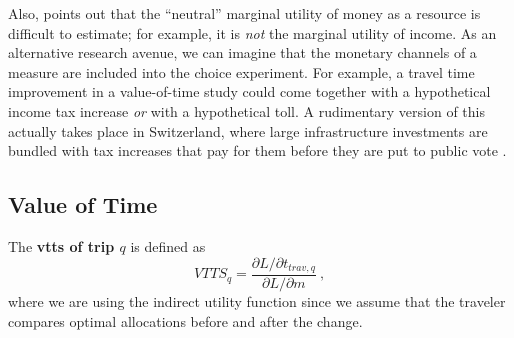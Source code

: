 Also, \cite{Small2012ValuationOfTimeRevisited} points out that the ``neutral'' marginal utility of money as a resource is difficult to estimate; for example, it is \emph{not} the marginal utility of income.  As an alternative research avenue, we can imagine that the monetary channels of a measure are included into the choice experiment.  For example, a travel time improvement in a value-of-time study could come together with a hypothetical income tax increase \emph{or} with a hypothetical toll.  A rudimentary version of this actually takes place in Switzerland, where large infrastructure investments are bundled with tax increases that pay for them before they are put to public vote \citep[see, e.g.,][]{BAV2013FinanzierungFABI}.







\subsection{Value of Time}

The \textbf{\gls{vtts} of trip $q$} is defined as
%
\begin{equation}
VTTS_q = \frac{\partial L/\partial t_{trav,q}}{\partial L/\partial m} \ ,
\label{eq:vot}
\end{equation}
where we are using the indirect utility function since we assume that the traveler compares optimal allocations before and after the change.

